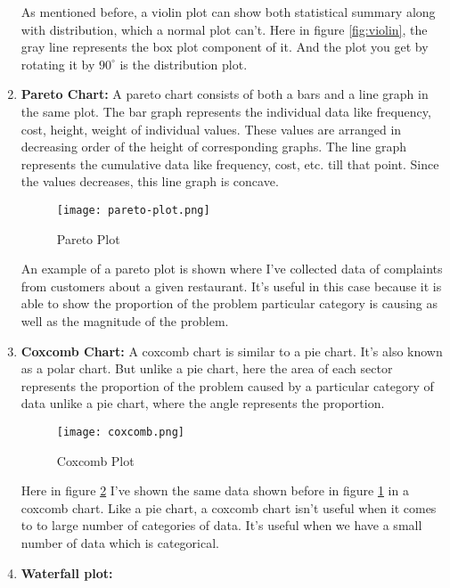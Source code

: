 \begin{tcolorbox}[breakable]
\begin{sol}
\begin{enumerate}
			      As mentioned before, a violin plot can show both
			      statistical summary along with distribution,
			      which a normal plot can't. Here in figure
			      \ref{fig:violin}, the gray line represents the
			      box plot component of it. And the plot you get by
			      rotating it by $90^\circ$ is the distribution
			      plot.
			\item \textbf{Pareto Chart:}
			      A pareto chart consists of both a bars and a line
			      graph in the same plot. The bar graph represents
			      the individual data like frequency, cost, height,
			      weight of individual values. These values are
			      arranged in decreasing order of the height of
			      corresponding graphs. The line graph represents
			      the cumulative data like frequency, cost, etc.
			      till that point. Since the values decreases, this
			      line graph is concave.
			      \begin{figure}[H]
				      \centering
				      \texttt{[image: pareto-plot.png]}
				      \caption{Pareto Plot}
				      \label{fig:pareto}
			      \end{figure}
			      An example of a pareto plot is shown where I've
			      collected data of complaints from customers about
			      a given restaurant. It's useful in this case
			      because it is able to show the proportion of the
			      problem particular category is causing as well as
			      the magnitude of the problem.
			\item \textbf{Coxcomb Chart:}
			      A coxcomb chart is similar to a pie chart. It's
			      also known as a polar chart. But unlike a pie
			      chart, here the area of each sector represents the
			      proportion of the problem caused by a particular
			      category of data unlike a pie chart, where the
			      angle represents the proportion.
			      \begin{figure}[H]
				      \centering
				      \texttt{[image: coxcomb.png]}
				      \caption{Coxcomb Plot}
				      \label{fig:coxcomb}
			      \end{figure}
			      Here in figure \ref{fig:coxcomb} I've shown the
			      same data shown before in figure \ref{fig:pareto}
			      in a coxcomb chart. Like a pie chart, a coxcomb
			      chart isn't useful when it comes to to large
			      number of categories of data. It's useful when we
			      have a small number of data which is categorical.
			\item \textbf{Waterfall plot:}

\end{enumerate}
\end{sol}
\end{tcolorbox}
